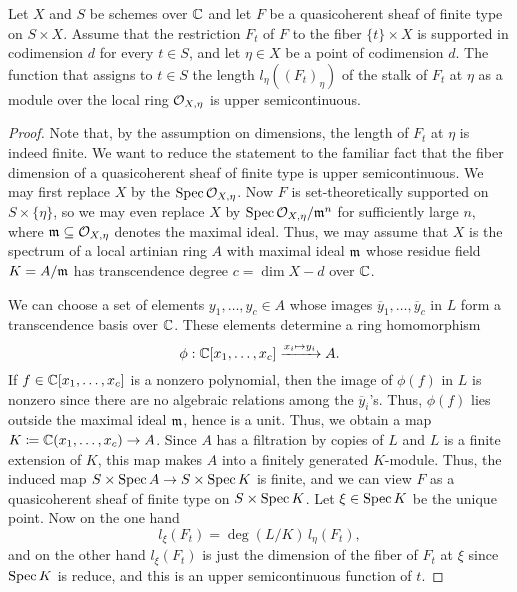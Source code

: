 \begin{lem}\label{uppersemi2}
Let $X$ and $S$ be schemes over $\mathbb{C}$ and let $F$ be a quasicoherent sheaf of finite type on $S \times X$. Assume that the restriction $F_t$ of $F$ to the fiber $\{t\} \times X$ is supported in codimension $d$ for every $t \in S$, and let $\eta \in X$ be a point of codimension $d$. The function that assigns to $t \in S$ the length $l_\eta((F_t)_\eta)$ of the stalk of $F_t$ at $\eta$ as a module over the local ring $\mathcal{O}_{X,\eta}$ is upper semicontinuous. 
\end{lem}
\begin{proof}
Note that, by the assumption on dimensions, the length of $F_t$ at $\eta$ is indeed finite. We want to reduce the statement to the familiar fact that the fiber dimension of a quasicoherent sheaf of finite type is upper semicontinuous. We may first replace $X$ by the $\operatorname{\mathrm{Spec}} \mathcal{O}_{X,\eta}$. Now $F$ is set-theoretically supported on $S \times \{\eta\}$, so we may even replace $X$ by $\operatorname{\mathrm{Spec}} \mathcal{O}_{X,\eta}/\mathfrak{m}^n$ for sufficiently large $n$, where $\mathfrak{m} \subseteq \mathcal{O}_{X,\eta}$ denotes the maximal ideal. Thus, we may assume that $X$ is the spectrum of a local artinian ring $A$ with maximal ideal $\mathfrak{m}$ whose residue field $K = A/\mathfrak{m}$ has transcendence degree $c = \dim X - d$ over $\mathbb{C}$. 

We can choose a set of elements $y_1, \ldots, y_c \in A$ whose images $\overline{y}_1,\ldots,\overline{y}_c$ in $L$ form a transcendence basis over $\mathbb{C}$. These elements determine a ring homomorphism
\[ \phi: \mathbb{C}[x_1, \ldots, x_c] \xrightarrow{x_i \mapsto y_i} A. \]
If $f \in \mathbb{C}[x_1,\ldots,x_c]$ is a nonzero polynomial, then the image of $\phi(f)$ in $L$ is nonzero since there are no algebraic relations among the $\overline{y}_i$'s. Thus, $\phi(f)$ lies outside the maximal ideal $\mathfrak{m}$, hence is a unit. Thus, we obtain a map $K \coloneqq \mathbb{C}(x_1,\ldots,x_c) \to A$. Since $A$ has a filtration by copies of $L$ and $L$ is a finite extension of $K$, this map makes $A$ into a finitely generated $K$-module. Thus, the induced map $S \times \operatorname{\mathrm{Spec}} A \to S \times \operatorname{\mathrm{Spec}} K$ is finite, and we can view $F$ as a quasicoherent sheaf of finite type on $S \times \operatorname{\mathrm{Spec}} K$. Let $\xi \in \operatorname{\mathrm{Spec}} K$ be the unique point. Now on the one hand
\[ l_\xi(F_t) = \deg(L/K) \, l_\eta(F_t), \]
and on the other hand $l_\xi(F_t)$ is just the dimension of the fiber of $F_t$ at $\xi$ since $\operatorname{\mathrm{Spec}} K$ is reduce, and this is an upper semicontinuous function of $t$.
\end{proof}

